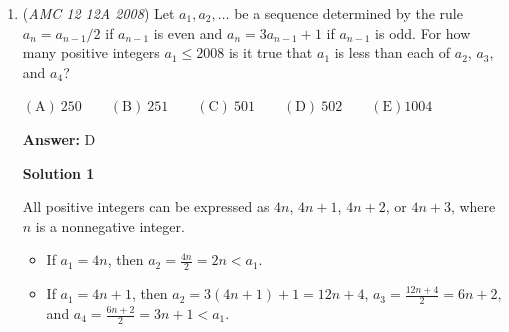 \begin{enumerate}
\textbf{Solution 4 (mimimal manipulation)}

Given the first three terms form an arithmetic progression, we have:
 \[a = \log(a^3b^7)\]
 \[a+d = \log(a^5b^{12})\]
 \[a+2d = \log(a^8b^{15}).\]Subtracting the first equation from the second and the third from the second, respectively, gives us these two expressions for $d$:
 \[d = \log \left( \frac{a^5b^{12}}{a^3b^7} \right) = \log a^2b^5\]
 \[d = \log \left( \frac{a^8b^{15}}{a^5b^{12}} \right) = \log a^3b^3.\]The desired $12$th term in the sequence is $a+11d$, so we can substitute our values for $a$ and $d$ (using either one of our two expressions for $d$):
 \[a+11d = \log a^3b^7 + 11\log(a^2b^5)\]
 \[= \log a^3b^7 + \log(a^{22}b^{55})\]
 \[= \log a^{25}b^{62}.\]The answer must be expressed as $\log(b^n)$, however. We're in luck: the two different yet equal expressions for $d$ allow us to express $a$ and $b$ in terms of each other:
 \[\log a^2b^5 = \log a^3b^3\]
 \[a^2b^5 = a^3b^3\]
 \[a=b^2.\]Plugging in $a=b^2$, we have:
 \[a+11d = \log b^{50}b^{62}\]
 \[= \log b^{112} \Rightarrow \boxed{D}.\]~ Jingwei325 $\smiley$



	\item (\textit{AMC 12 12A 2008}) Let $a_1,a_2,\ldots$ be a sequence determined by the rule $a_n=a_{n-1}/2$ if $a_{n-1}$ is even and $a_n=3a_{n-1}+1$ if $a_{n-1}$ is odd. For how many positive integers $a_1 \le 2008$ is it true that $a_1$ is less than each of $a_2$, $a_3$, and $a_4$? 


 $\mathrm{(A)}\ 250\qquad\mathrm{(B)}\ 251\qquad\mathrm{(C)}\ 501\qquad\mathrm{(D)}\ 502\qquad\mathrm{(E)} 1004$

 \textbf{Answer: }D



\textbf{Solution 1}

All positive integers can be expressed as $4n$, $4n+1$, $4n+2$, or $4n+3$, where $n$ is a nonnegative integer. 

 
            \begin{itemize}
        \item If $a_1=4n$, then $a_2=\frac{4n}{2}=2n<a_1$.
            \end{itemize}
            
            \begin{itemize}
        \item If $a_1=4n+1$, then $a_2=3(4n+1)+1=12n+4$, $a_3=\frac{12n+4}{2}=6n+2$, and $a_4=\frac{6n+2}{2}=3n+1<a_1$.
            \end{itemize}
            

\end{enumerate}
